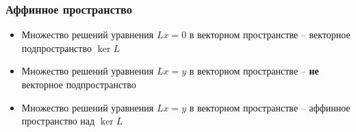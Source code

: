 \documentclass{beamer}
\begin{document}
\begin{frame}[fragile]
\frametitle{Аффинное пространство}
\begin{itemize}
\item Множество решений уравнения \begin{math}Lx=0\end{math} в векторном пространстве -- векторное подпространство \begin{math}\ker L\end{math}
\pause
\item Множество решений уравнения \begin{math}Lx=y\end{math} в векторном пространстве -- \textbf{не} векторное подпространство
\pause
\item Множество решений уравнения \begin{math}Lx=y\end{math} в векторном пространстве -- аффинное пространство над \begin{math}\ker L\end{math}
\end{itemize}
\end{frame}
\end{document}
